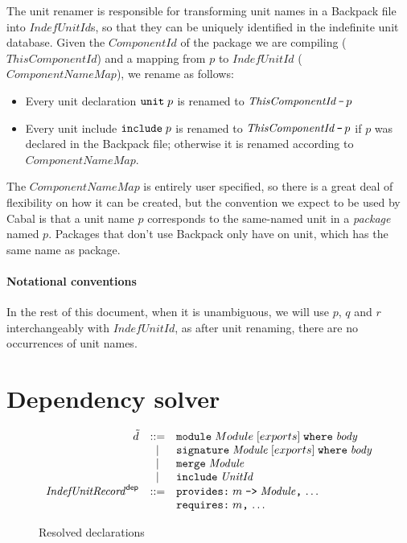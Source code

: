 \documentclass{article}
\newcommand{\I}[1]{\ensuremath{\mathit{#1}}}
\begin{document}
The unit renamer is responsible for transforming unit names in a
Backpack file into \I{IndefUnitId}s, so that they can be uniquely
identified in the indefinite unit database.
Given the \I{ComponentId} of the package we are compiling (\I{ThisComponentId})
and a mapping from $p$ to \I{IndefUnitId} (\I{ComponentNameMap}), we rename
as follows:

\begin{itemize}
    \item Every unit declaration $\verb|unit|\; p$ is renamed to $\I{ThisComponentId}\, \verb|-|\, p$
    \item Every unit include $\verb|include|\; p$ is renamed to $\I{ThisComponentId}\, \verb|-|\, p$ if $p$ was declared in the Backpack file; otherwise it is renamed according to \I{ComponentNameMap}.
\end{itemize}

The \I{ComponentNameMap} is entirely user specified, so there is a great deal
of flexibility on how it can be created, but the convention we expect to
be used by Cabal is that a unit name $p$ corresponds to the same-named
unit in a \emph{package} named $p$.  Packages that don't use Backpack
only have on unit, which has the same name as package.

\paragraph{Notational conventions}
In the rest of this document, when it is unambiguous, we will use $p$, $q$ and $r$
interchangeably with \I{IndefUnitId}, as after unit renaming, there
are no occurrences of unit names.

\newpage
\section{Dependency solver}

\begin{figure}[htpb]
$$
\begin{array}{rcll}
  \tilde{d} & ::= & \verb|module|\;    Module \; [exports]\; \verb|where|\; \I{body} \\
    & |   & \verb|signature|\; \I{Module} \; [exports]\; \verb|where|\; \I{body} \\
    & |   & \verb|merge|\; \I{Module} \\
    & |   & \verb|include|\; \I{UnitId} \\
  \I{IndefUnitRecord}^{\mathsf{dep}} & ::= & \verb|provides:|\; m\; \verb|->|\; \I{Module}\verb|,|\, \ldots\\
    & & \verb|requires:|\; m\verb|,|\, \ldots
\end{array}
$$
\caption{Resolved declarations} \label{fig:resolved}
\end{figure}
\end{document}
